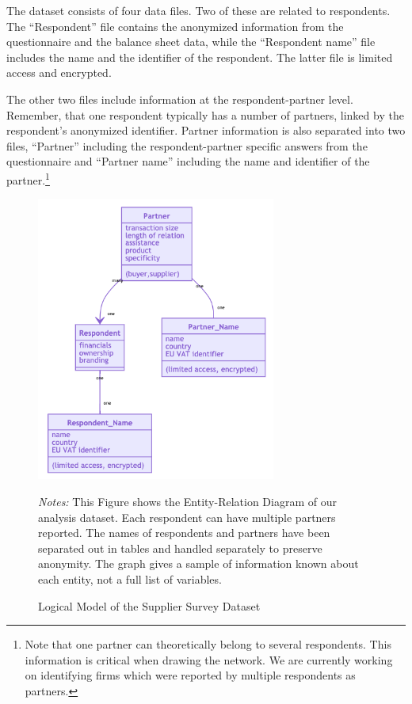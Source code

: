 \documentclass[final, dvipsnames, authoryear,12pt]{elsarticle}
\begin{document}
The dataset consists of four data files. Two of these are related to respondents. The ``Respondent'' file contains the anonymized information from the questionnaire and the balance sheet data, while the ``Respondent name'' file includes the name and the identifier of the respondent. The latter file is limited access and encrypted. 

The other two files include information at the respondent-partner level. Remember, that one respondent typically has a number of partners, linked by the respondent's anonymized identifier. Partner information is also separated into two files, ``Partner'' including the respondent-partner specific answers from the questionnaire and ``Partner name'' including the name and identifier of the partner.\footnote{Note that one partner can theoretically belong to several respondents. This information is critical when drawing the network. We are currently working on identifying firms which were reported by multiple respondents as partners.}

\begin{figure}[!h]
    \caption{Logical Model of the Supplier Survey Dataset}
    \label{fig:ERD} 
    \begin{center}    
    \includegraphics[width=0.7\textwidth]{graphs/ERD.png}
     \end{center}    
        {\scriptsize \textit{Notes:} This Figure shows the Entity-Relation Diagram of our analysis dataset. Each respondent can have multiple partners reported. The names of respondents and partners have been separated out in tables and handled separately to preserve anonymity. The graph gives a sample of information known about each entity, not a full list of variables.} 
\end{figure}
\end{document}
